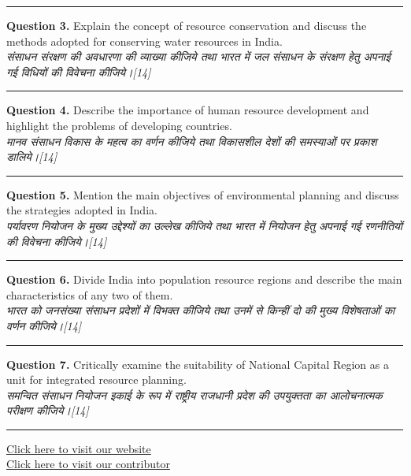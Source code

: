 \documentclass[11pt,a4paper]{article}
\newcommand{\pts}[1]{\hfill   \textit{[#1]}}
\begin{document}
\medskip\rule{\linewidth}{0.2pt}\medskip




\noindent   \textbf{Question 3.} Explain the concept of resource conservation and discuss the methods adopted for conserving water resources in India.\\
   \textit{संसाधन संरक्षण की अवधारणा की व्याख्या कीजिये तथा भारत में जल संसाधन के संरक्षण हेतु अपनाई गई विधियों की विवेचना कीजिये।}\pts{14}

\medskip\rule{\linewidth}{0.2pt}\medskip




\noindent   \textbf{Question 4.} Describe the importance of human resource development and highlight the problems of developing countries.\\
   \textit{मानव संसाधन विकास के महत्व का वर्णन कीजिये तथा विकासशील देशों की समस्याओं पर प्रकाश डालिये।}\pts{14}

\medskip\rule{\linewidth}{0.2pt}\medskip




\noindent   \textbf{Question 5.} Mention the main objectives of environmental planning and discuss the strategies adopted in India.\\
   \textit{पर्यावरण नियोजन के मुख्य उद्देश्यों का उल्लेख कीजिये तथा भारत में नियोजन हेतु अपनाई गई रणनीतियों की विवेचना कीजिये।}\pts{14}

\medskip\rule{\linewidth}{0.2pt}\medskip




\noindent   \textbf{Question 6.} Divide India into population resource regions and describe the main characteristics of any two of them.\\
   \textit{भारत को जनसंख्या संसाधन प्रदेशों में विभक्त कीजिये तथा उनमें से किन्हीं दो की मुख्य विशेषताओं का वर्णन कीजिये।}\pts{14}

\medskip\rule{\linewidth}{0.2pt}\medskip




\noindent   \textbf{Question 7.} Critically examine the suitability of National Capital Region as a unit for integrated resource planning.\\
   \textit{समन्वित संसाधन नियोजन इकाई के रूप में राष्ट्रीय राजधानी प्रदेश की उपयुक्तता का आलोचनात्मक परीक्षण कीजिये।}\pts{14}

\vfill
\rule{\linewidth}{0.4pt}

\begin{center}\small
\href{https://bhu-exam.vercel.app/}{Click here to visit our website}\\[4pt]
\href{https://me-aryan.vercel.app/}{Click here to visit our contributor}
\end{center}
\end{document}
